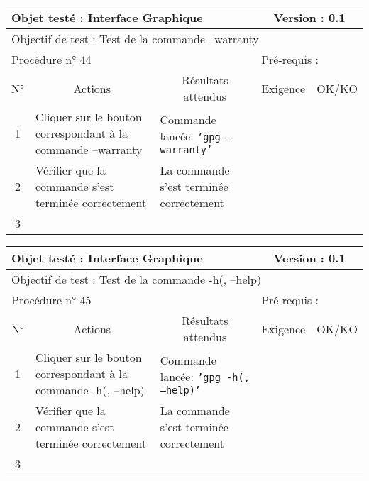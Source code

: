 \documentclass{../res/univ-projet}
\begin{document}
\begin{center}
\begin{tabular}{|c|p{5cm}|p{5cm}|p{1.5cm}|p{1.5cm}|}
\hline
\multicolumn{3}{|l|}{Objet testé : Interface Graphique} & \multicolumn{2}{c|}{Version : 0.1}\\ \hline
\multicolumn{5}{|l|}{Objectif de test : Test de la commande –warranty}\\ \hline
\multicolumn{3}{|l|}{Procédure n° 44} & \multicolumn{2}{p{3cm}|}{Pré-requis : }\\ \hline
\multicolumn{1}{|c|}{N°} & \multicolumn{1}{c|}{Actions} & \multicolumn{1}{c|}{Résultats attendus} & 
\multicolumn{1}{c|}{Exigence} & \multicolumn{1}{c|}{OK/KO}\\ \hline
1 & Cliquer sur le bouton correspondant à la commande –warranty & Commande lancée: \texttt{'gpg –warranty'} &  & \\
2 & Vérifier que la commande s'est terminée correctement & La commande s'est terminée correctement &  & \\
3 &  &  &  & \\ \hline
\end{tabular}
\vskip 2.2cm


\begin{tabular}{|c|p{5cm}|p{5cm}|p{1.5cm}|p{1.5cm}|}
\hline
\multicolumn{3}{|l|}{Objet testé : Interface Graphique} & \multicolumn{2}{c|}{Version : 0.1}\\ \hline
\multicolumn{5}{|l|}{Objectif de test : Test de la commande -h(, –help)}\\ \hline
\multicolumn{3}{|l|}{Procédure n° 45} & \multicolumn{2}{p{3cm}|}{Pré-requis : }\\ \hline
\multicolumn{1}{|c|}{N°} & \multicolumn{1}{c|}{Actions} & \multicolumn{1}{c|}{Résultats attendus} & 
\multicolumn{1}{c|}{Exigence} & \multicolumn{1}{c|}{OK/KO}\\ \hline
1 & Cliquer sur le bouton correspondant à la commande -h(, –help) & Commande lancée: \texttt{'gpg -h(, –help)'} &  & \\
2 & Vérifier que la commande s'est terminée correctement & La commande s'est terminée correctement &  & \\
3 &  &  &  & \\ \hline
\end{tabular}
\vskip 2.2cm



\end{center}
\end{document}
